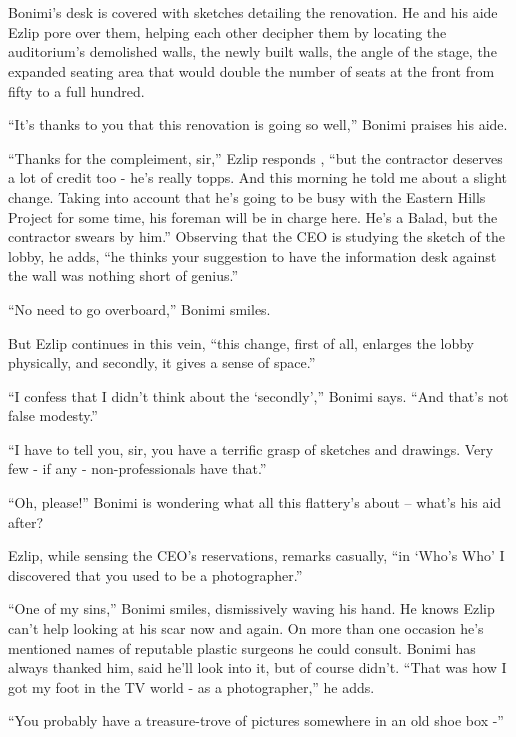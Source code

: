 \documentclass[twoside,11pt]{book}
\begin{document}
\chapter{}

Bonimi's  desk is covered with sketches detailing the renovation. He and his aide Ezlip pore over
them, helping each other  decipher them by locating the auditorium's demolished walls, the newly built walls, the angle
of the stage, the expanded seating area that would double the number of seats at the front from fifty to a
full hundred.

``It's thanks to you that this renovation is going so well,'' Bonimi praises his aide.

``Thanks for the compleiment, sir,'' Ezlip responds , ``but the contractor
deserves a lot of credit too - he's really topps. And this morning he told me about a slight change. Taking into
account that he's going to be busy with the Eastern Hills Project for some time, his foreman will be in charge here.
He's a Balad, but the contractor swears by him.'' Observing that the CEO is studying the
sketch of the lobby, he adds, ``he thinks your suggestion to have the information desk
against the wall was nothing short of genius.''

``No need to go overboard,'' Bonimi smiles.

But Ezlip continues in this vein, ``this change, first of all, enlarges the lobby physically, and secondly,
it gives a sense of space.''

``I confess that I didn't think about the `secondly','' Bonimi says. ``And that's
not false modesty.''

``I have to tell you, sir, you have a terrific grasp of sketches and drawings. Very few - if any -
non-professionals have that.''

``Oh, please!'' Bonimi is wondering what all this flattery's about -- what's his aid after?

Ezlip, while sensing the CEO's reservations, remarks casually, ``in `Who's Who' I discovered that you used
to be a photographer.''

``One of my sins,'' Bonimi smiles, dismissively waving his hand. He knows Ezlip can't help
looking at his scar now and again. On more than one occasion he's mentioned names of reputable plastic
surgeons he could consult. Bonimi has always thanked him, said he'll look into it, but of course didn't.
``That was how I got my foot in the TV world - as a photographer,'' he adds.

``You probably have a treasure-trove of pictures somewhere in an old shoe box -''
\end{document}
